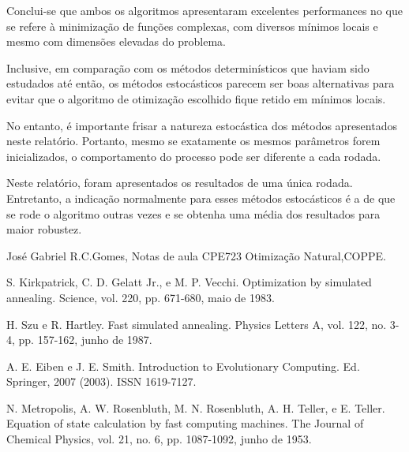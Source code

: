 \documentclass[conference,compsoc]{IEEEtran}
\begin{document}
Conclui-se que ambos os algoritmos apresentaram excelentes performances no que se refere à minimização de funções complexas, com diversos mínimos locais e mesmo com dimensões elevadas do problema. 

Inclusive, em comparação com os métodos determinísticos que haviam sido estudados até então, os métodos estocásticos parecem ser boas alternativas para evitar que o algoritmo de otimização escolhido fique retido em mínimos locais.

No entanto, é importante frisar a natureza estocástica dos métodos apresentados neste relatório. Portanto, mesmo se exatamente os mesmos parâmetros forem inicializados, o comportamento do processo pode ser diferente a cada rodada.

Neste relatório, foram apresentados os resultados de uma única rodada. Entretanto, a indicação normalmente para esses métodos estocásticos é a de que se rode o algoritmo outras vezes e se obtenha uma média dos resultados para maior robustez.

\begin{thebibliography}{1}

José Gabriel R.C.Gomes, Notas de aula CPE723 Otimização Natural,COPPE.

S. Kirkpatrick, C. D. Gelatt Jr., e M. P. Vecchi. Optimization by simulated annealing. Science, vol. 220, pp.
671-680, maio de 1983.

H. Szu e R. Hartley. Fast simulated annealing. Physics Letters A, vol. 122, no. 3-4, pp. 157-162, junho de
1987.

A. E. Eiben e J. E. Smith. Introduction to Evolutionary Computing. Ed. Springer, 2007 (2003). ISSN
1619-7127.

N. Metropolis, A. W. Rosenbluth, M. N. Rosenbluth, A. H. Teller, e E. Teller. Equation of state calculation by fast computing machines. The Journal of Chemical Physics, vol. 21, no. 6, pp. 1087-1092, junho de 1953.

\end{thebibliography}
\end{document}

